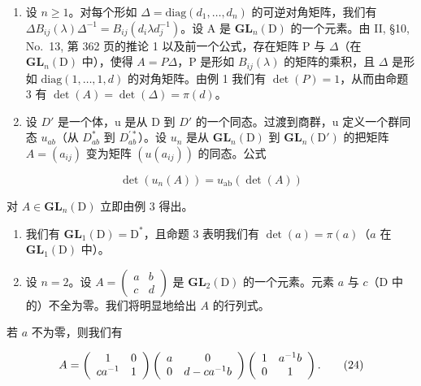 \begin{enumerate}
\def\labelenumi{\arabic{enumi})}
\setcounter{enumi}{2}
\item
  设 \(n \geqslant 1\)。对每个形如 \(\Delta = \text{diag}(d_1, \ldots, d_n)\) 的可逆对角矩阵，我们有 \(\Delta B_{ij}(\lambda)\Delta^{-1} = B_{ij}(d_i\lambda d_j^{-1})\)。设 A 是 \(\mathbf{GL}_n(\mathrm{D})\) 的一个元素。由 II, §10, No.~13, 第 362 页的推论 1 以及前一个公式，存在矩阵 P 与 \(\Delta\)（在 \(\mathbf{GL}_n(\mathrm{D})\) 中），使得 \(A = P\Delta\)，P 是形如 \(B_{ij}(\lambda)\) 的矩阵的乘积，且 \(\Delta\) 是形如 \(\text{diag}(1, \ldots, 1, d)\) 的对角矩阵。由例 1 我们有 \(\det(P) = 1\)，从而由命题 3 有 \(\det(A) = \det(\Delta) = \pi(d)\)。
\item
  设 \(D'\) 是一个体，u 是从 D 到 \(D'\) 的一个同态。过渡到商群，u 定义一个群同态 \(u_{ab}\)（从 \(D_{ab}^{*}\) 到 \(D_{ab}^{\prime *}\)）。设 \(u_{n}\) 是从 \(\mathbf{GL}_{n}(\mathrm{D})\) 到 \(\mathbf{GL}_{n}(\mathrm{D}')\) 的把矩阵 \(A = (a_{ij})\) 变为矩阵 \((u(a_{ij}))\) 的同态。公式
\end{enumerate}

\[
\det (u _ {n} (A)) = u _ {\mathrm{ab}} (\det (A))\tag{23}
\]

对 \(A \in \mathbf{GL}_n(\mathrm{D})\) 立即由例 3 得出。

\begin{enumerate}
\def\labelenumi{\arabic{enumi})}
\setcounter{enumi}{4}
\item
  我们有 \(\mathbf{GL}_1(\mathrm{D}) = \mathrm{D}^*\)，且命题 3 表明我们有 \(\det(a) = \pi(a)\)（\(a\) 在 \(\mathbf{GL}_1(\mathrm{D})\) 中）。
\item
  设 \(n = 2\)。设 \(A = \begin{pmatrix} a & b \\ c & d \end{pmatrix}\) 是 \(\mathbf{GL}_2(\mathrm{D})\) 的一个元素。元素 \(a\) 与 \(c\)（\(\mathrm{D}\) 中的）不全为零。我们将明显地给出 \(A\) 的行列式。
\end{enumerate}

若 \(a\) 不为零，则我们有

\[
A = \left( \begin{array}{c c} 1 & 0 \\ c a ^ {- 1} & 1 \end{array} \right) \left( \begin{array}{c c} a & 0 \\ 0 & d - c a ^ {- 1} b \end{array} \right) \left( \begin{array}{c c} 1 & a ^ {- 1} b \\ 0 & 1 \end{array} \right).\tag{24}
\]

